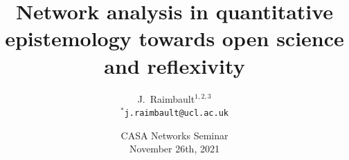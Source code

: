 



\title
[Network analysis in quantitative epistemology]{Network analysis in quantitative epistemology towards open science and reflexivity}
\author[Raimbault]{J.~Raimbault$^{1,2,3}$\\\medskip
$^{\ast}$\texttt{j.raimbault@ucl.ac.uk}
}





\date[26/11/2021]{CASA Networks Seminar\\
November 26th, 2021
}

\frame{\maketitle}








